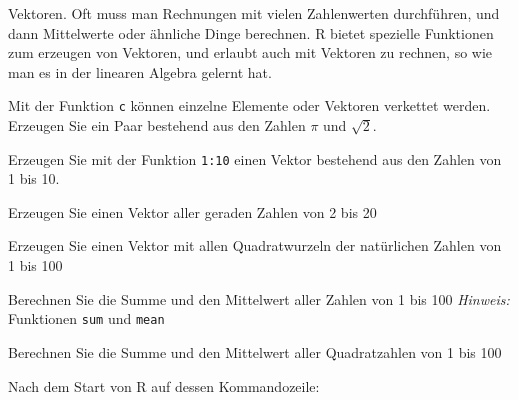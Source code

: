 Vektoren. Oft muss man Rechnungen mit vielen Zahlenwerten durchführen,
und dann Mittelwerte oder ähnliche Dinge berechnen. R bietet spezielle
Funktionen zum erzeugen von Vektoren, und erlaubt auch mit Vektoren
zu rechnen, so wie man es in der linearen Algebra gelernt hat.
\begin{teilaufgaben}
\item Mit der Funktion {\tt c} können einzelne Elemente oder
Vektoren verkettet werden. Erzeugen Sie ein Paar bestehend aus
den Zahlen $\pi$ und $\sqrt{2}$.
\item Erzeugen Sie mit der Funktion {\tt 1:10} einen Vektor bestehend
aus den Zahlen von 1 bis 10.
\item Erzeugen Sie einen Vektor aller geraden Zahlen von 2 bis 20
\item Erzeugen Sie einen Vektor mit allen Quadratwurzeln der natürlichen
Zahlen von 1 bis 100
\item Berechnen Sie die Summe und den Mittelwert aller Zahlen von 1 bis 100
\quad
{\it Hinweis\/:} Funktionen {\tt sum} und {\tt mean}
\item Berechnen Sie die Summe und den Mittelwert aller Quadratzahlen von 1 bis 100
\end{teilaufgaben}


\begin{loesung}
Nach dem Start von R auf dessen Kommandozeile:
\begin{small}
\end{small}
\end{loesung}

